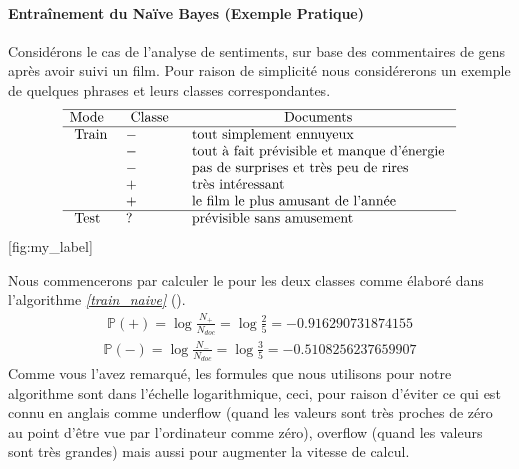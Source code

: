 \documentclass[letterpaper,11pt,english]{sphinxmanual}
\begin{document}
\paragraph{Entraînement du Naïve Bayes (Exemple Pratique)}
\label{\detokenize{chapter3:entrainement-du-naive-bayes-exemple-pratique}}
\sphinxAtStartPar
Considérons le cas de l’analyse de sentiments, sur base des commentaires
de gens après avoir suivi un film. Pour raison de simplicité nous
considérerons un exemple de quelques phrases et leurs classes
correspondantes.
\begin{equation}\label{equation:chapter3:chapter3:51}
\begin{split}\begin{array}{lll}
    \hline \text{Mode} & \text { Classe } & \multicolumn{1}{c} {\text { Documents }} \\
    \hline \text{ Train } & - & \text { tout simplement ennuyeux } \\
    & - & \text { tout à fait prévisible et manque d'énergie } \\
    & - & \text { pas de surprises et très peu de rires } \\
    & + & \text { très intéressant } \\
    & + & \text { le film le plus amusant de l'année } \\
    \hline \text { Test } & ? & \text { prévisible sans amusement }
    \end{array}\end{split}
\end{equation}
\sphinxAtStartPar
{[}fig:my\_label{]}

\sphinxAtStartPar
Nous commencerons par calculer le  pour les deux classes
comme élaboré dans l’algorithme {\hyperref[\detokenize{chapter3:train_naive}]{\emph{{[}train\_naive{]}}}} ().
\begin{equation}\label{equation:chapter3:chapter3:52}
\begin{split}\mathbb{P}(+) = \log \frac{N_{+}}{N_{doc}}= \log \frac{2}{5}= -0.916290731874155\end{split}
\end{equation}\begin{equation}\label{equation:chapter3:chapter3:53}
\begin{split}\mathbb{P}(-) = \log \frac{N_{-}}{N_{doc}} = \log \frac{3}{5} = -0.5108256237659907\end{split}
\end{equation}
\sphinxAtStartPar
Comme vous l’avez remarqué, les formules que nous utilisons pour notre
algorithme sont dans l’échelle logarithmique, ceci, pour raison d’éviter
ce qui est connu en anglais comme underflow (quand les valeurs sont très
proches de zéro au point d’être vue par l’ordinateur comme zéro),
overflow (quand les valeurs sont très grandes) mais aussi pour augmenter
la vitesse de calcul.
\end{document}
